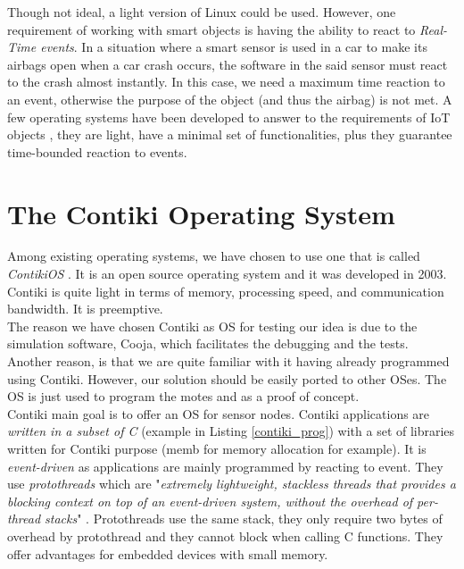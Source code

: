 Though not ideal, a light version of Linux could be used. However, one requirement of working with smart objects is having the ability to react to \textit{Real-Time events}. In a situation where a smart sensor is used in a car to make its airbags open when a car crash occurs, the software in the said sensor must react to the crash almost instantly. In this case, we need a maximum time reaction to an event, otherwise the purpose of the object (and thus the airbag) is not met. A few operating systems have been developed to answer to the requirements of IoT objects \cite{website:iot_os}, they are light, have a minimal set of functionalities, plus they guarantee time-bounded reaction to events.\\

\section{The Contiki Operating System}

Among existing operating systems, we have chosen to use one that is called \textit{ContikiOS} \cite{website:contiki}. It is an open source operating system and it was developed in 2003. Contiki is quite light in terms of memory, processing speed, and communication bandwidth. It is preemptive.\\

The reason we have chosen Contiki as OS for testing our idea is due to the simulation software, Cooja, which facilitates the debugging and the tests. Another reason, is that we are quite familiar with it having already programmed using Contiki. However, our solution should be easily ported to other OSes. The OS is just used to program the motes and as a proof of concept.\\

Contiki main goal is to offer an OS for sensor nodes. Contiki applications are \textit{written in a subset of C} (example in Listing \ref{contiki_prog}) with a set of libraries written for Contiki purpose (memb for memory allocation for example). It is \textit{event-driven} as applications are mainly programmed by reacting to event. They use \textit{protothreads} which are "\textit{extremely lightweight, stackless threads that provides a blocking context on top of an event-driven system, without the overhead of per-thread stacks}" \cite{website:protothread}. Protothreads use the same stack, they only require two bytes of overhead by protothread and they cannot block when calling C functions. They offer advantages for embedded devices with small memory. \\

